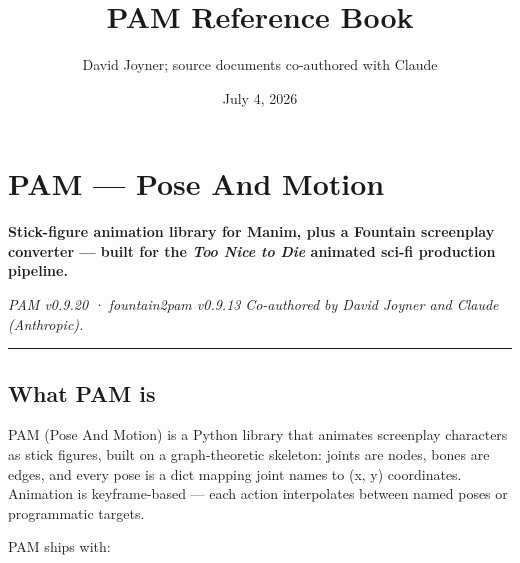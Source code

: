 \documentclass[
  11pt,
]{book}
\title{PAM Reference Book}
\author{David Joyner; source documents co-authored with Claude}
\date{July 4, 2026}
\begin{document}
\frontmatter
\maketitle

{
\hypersetup{linkcolor=}
\setcounter{tocdepth}{3}
\tableofcontents
}
\mainmatter
\chapter{PAM --- Pose And Motion}\label{pam-pose-and-motion}

\textbf{Stick-figure animation library for Manim, plus a Fountain
screenplay converter --- built for the \emph{Too Nice to Die} animated
sci-fi production pipeline.}

\emph{PAM v0.9.20 · fountain2pam v0.9.13} \emph{Co-authored by David
Joyner and Claude (Anthropic).}

\begin{center}\rule{0.5\linewidth}{0.5pt}\end{center}

\section{What PAM is}\label{what-pam-is}

PAM (Pose And Motion) is a Python library that animates screenplay
characters as stick figures, built on a graph-theoretic skeleton: joints
are nodes, bones are edges, and every pose is a dict mapping joint names
to (x, y) coordinates. Animation is keyframe-based --- each action
interpolates between named poses or programmatic targets.

PAM ships with:
\end{document}
